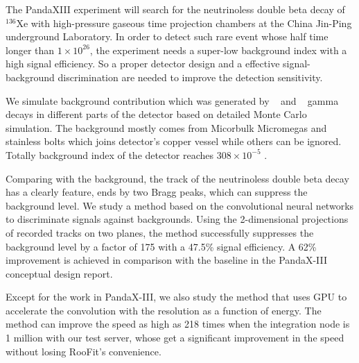 \begin{eabstract}
    The PandaXIII experiment will search for the neutrinoless double beta decay of $^{136}$Xe with high-pressure gaseous time projection chambers at the China Jin-Ping underground Laboratory. In order to detect such rare event whose half time longer than $1\times10^{26}$, the experiment needs a super-low background index with a high signal efficiency. So a proper detector design and a effective signal-background discrimination are needed to improve the detection sensitivity.

    We simulate background contribution which was generated by \utte~ and \thttt~ gamma decays in different parts of the detector based on detailed Monte Carlo simulation. The background mostly comes from Micorbulk Micromegas and stainless bolts which joins detector's copper vessel while others can be ignored. Totally background index of the detector reaches $308\times 10^{-5}$ \ckky.

    Comparing with the background, the track of the neutrinoless double beta decay has a clearly feature,  ends by two Bragg peaks, which can suppress the background level. We study a method based on the convolutional neural networks to discriminate signals against backgrounds. Using the 2-dimensional projections of recorded tracks on two planes, the method successfully suppresses the background level by a factor of 175 with a 47.5\% signal efficiency. A 62\% improvement is achieved in comparison with the baseline in the PandaX-III conceptual design report.

    Except for the work in PandaX-III, we also study the method that uses GPU to accelerate the convolution with the resolution as a function of energy. The method can improve the speed as high as 218 times when the integration node is 1 million with our test server, whose get a significant improvement in the speed without losing RooFit's convenience. 

\end{eabstract}

